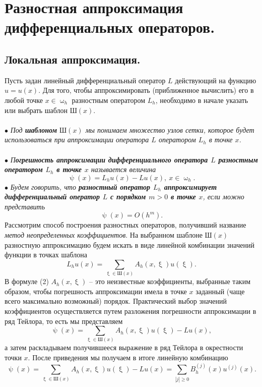 \documentclass[a4paper, 12pt]{report}
\numberwithin{equation}{section}
\renewcommand{\geq}{\geqslant}
\renewcommand{\psi}{\uppsi}
\renewcommand{\omega}{\upomega}
\renewcommand{\xi}{\upxi}
\begin{document}
	\section{Разностная аппроксимация дифференциальных операторов.}
	\subsection{Локальная аппроксимация.}
	Пусть задан линейный дифференциальный оператор $L$ действующий на функцию $u=u(x)$. Для того, чтобы аппроксимировать (приближенное вычислить) его в любой точке $x\in \omega _h$ разностным оператором $L_h$, необходимо в начале указать или выбрать шаблон $\text {Ш} (x)$. \\\\
	$\bullet$ \textit{Под \textbf{шаблоном} $\text{Ш}(x)$ мы понимаем множество узлов сетки, которое будет использоваться при аппроксимации оператора $L$ оператором $L_h$ в точке $x$.}\\\\
	$\bullet$ \textit{П\textbf{огрешность аппроксимации дифференциального оператора $L$ разностным оператором $L_h$ в точке $x$} называется величина }
	\begin{equation}
		\psi(x) = L_hu(x) - Lu(x),\ x\in \omega_h.
	\end{equation}
	$\bullet$ \textit{Будем говорить, что \textbf{разностный оператор $L_h$ аппроксимирует дифференциальный оператор $L$ с порядком $m>0$ в точке $x$}, если можно представить} $$\psi(x) = O(h^m).$$
	Рассмотрим способ построения разностных операторов, получивший название \textit{метод неопределенных коэффициентов}. На выбранном шаблоне $\text{Ш}(x)$ разностную аппроксимацию будем искать в виде линейной комбинации значений функции в точках шаблона \begin{equation}
		L_hu(x) = \sum_{\xi \in \text{Ш}(x)} A_h(x, \xi) u(\xi).
	\end{equation}
	В формуле (2) $A_h(x, \xi)$ -- это неизвестные коэффициенты, выбранные таким образом, чтобы погрешность аппроксимации имела в точке $x$ заданный (чаще всего максимально возможный) порядок. Практический выбор значений коэффициентов осуществляется путем разложения погрешности аппроксимации в ряд Тейлора, то есть мы представляем $$\psi(x) = \sum_{\xi \in \text{Ш}(x)} A_h(x, \xi) u(\xi) - Lu(x),$$
	а затем раскладываем получившееся выражение в ряд Тейлора в окрестности точки $x$. После приведения мы получаем в итоге линейную комбинацию 
	$$\psi(x) = \sum_{\xi \in \text{Ш}(x)} A_h(x, \xi) u(\xi) - Lu(x) = \sum_{|j|\geq 0} B_h^{(j)}(x) u^{(j)}(x).$$
\end{document}
